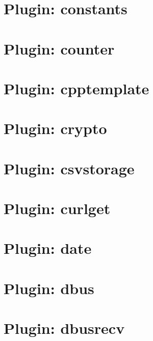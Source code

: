 \let\mypdfximage\pdfximage\def\pdfximage{\immediate\mypdfximage}\documentclass[twoside]{book}
\newcommand{\+}{\discretionary{\mbox{\scriptsize$\hookleftarrow$}}{}{}}
\begin{document}
\chapter{Plugin\+: constants}
\label{md_src_plugins_constants_README}

\chapter{Plugin\+: counter}
\label{md_src_plugins_counter_README}

\chapter{Plugin\+: cpptemplate}
\label{md_src_plugins_cpptemplate_README}

\chapter{Plugin\+: crypto}
\label{md_src_plugins_crypto_README}

\chapter{Plugin\+: csvstorage}
\label{md_src_plugins_csvstorage_README}

\chapter{Plugin\+: curlget}
\label{md_src_plugins_curlget_README}

\chapter{Plugin\+: date}
\label{md_src_plugins_date_README}

\chapter{Plugin\+: dbus}
\label{md_src_plugins_dbus_README}

\chapter{Plugin\+: dbusrecv}
\label{md_src_plugins_dbusrecv_README}

\end{document}
